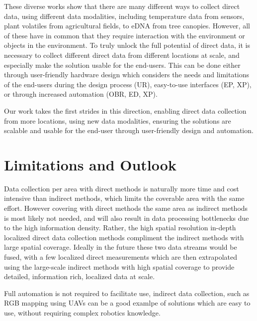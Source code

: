 These diverse works show that there are many different ways to collect direct data, using different data modalities, including  temperature data from sensors, plant volatiles from agricultural fields, to eDNA from tree canopies. However, all of these have in common that they require interaction with the environment or objects in the environment. To truly unlock the full potential of direct data,  it is necessary to collect different direct data from  different locations at scale, and  especially make the solution usable for the end-users. 
This can be done either through user-friendly hardware design which considers the needs and limitations of the end-users during the design process (UR), easy-to-use interfaces (EP, XP), or through increased automation (OBR, ED, XP). 

Our work takes the first strides in this direction, enabling direct data collection from more locations, using new data modalities, ensuring the solutions are scalable and usable for the end-user through user-friendly design and automation.


\section{Limitations and Outlook} %

Data collection per area with direct methods is naturally more time and cost intensive than indirect methods, which limits the coverable area with the same effort. 
However covering with direct methods the same area as indirect methods is most likely not needed, and will also result in data processing bottlenecks due to the  high information density. Rather, the high spatial resolution in-depth localized direct data collection methods compliment the indirect methods with large spatial coverage.  Ideally in the future these two data streams would be fused, with a few localized direct measurements which are then extrapolated using the large-scale indirect methods with high spatial coverage to provide detailed, information rich, localized data at scale.


Full automation is not required to facilitate use, indirect data collection, such as RGB mapping using UAVs can be a good examlpe of solutions which are easy to use, without requiring complex robotics knowledge. 

